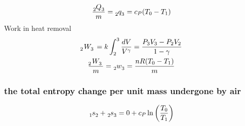 \documentclass[12pt]{article}
\numberwithin{equation}{section}
\begin{document}
\begin{flushleft}
\begin{equation}
  \frac{\tensor[_2]{Q}{_3}}{m} = \tensor[_2]{q}{_3} = c_P (T_0 - T_1)
\end{equation}
Work in heat removal
\begin{gather}
  \tensor[_2]{W}{_3} = k \int_2^3 \frac{dV}{V^\gamma} = \frac{P_3 V_3 - P_2 V_2}{1 - \gamma} \\
  \frac{\tensor[_2]{W}{_3}}{m} = \tensor[_2]{w}{_3} = \frac{nR(T_0 - T_1)}{m}
\end{gather}
\subsubsection{the total entropy change per unit mass undergone by air}
\begin{equation}
  \tensor[_1]{s}{_2} + \tensor[_2]{s}{_3} = 0 + c_P \ln \left( \frac{T_0}{T_1} \right)
\end{equation}



\end{flushleft}
\end{document}
